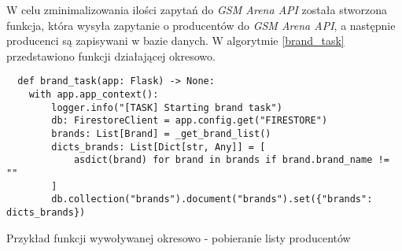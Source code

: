 W celu zminimalizowania ilości zapytań do \textit{GSM Arena API} została stworzona funkcja, która wysyła zapytanie o producentów do \textit{GSM Arena API}, a następnie producenci są zapisywani w bazie danych. W algorytmie \ref{brand_task} przedstawiono funkcji działającej okresowo.

\begin{code}[H]
  \begin{verbatim}
  def brand_task(app: Flask) -> None:
    with app.app_context():
        logger.info("[TASK] Starting brand task")
        db: FirestoreClient = app.config.get("FIRESTORE")
        brands: List[Brand] = _get_brand_list()
        dicts_brands: List[Dict[str, Any]] = [
            asdict(brand) for brand in brands if brand.brand_name != ""
        ]
        db.collection("brands").document("brands").set({"brands": dicts_brands})
  \end{verbatim}
  \caption{Przykład funkcji wywoływanej okresowo - pobieranie listy producentów}
  \label{brand_task}
\end{code}


